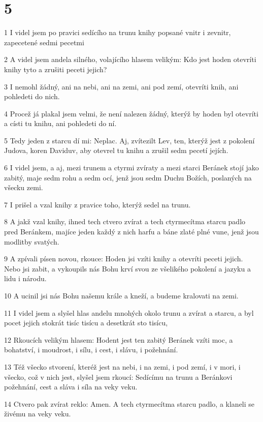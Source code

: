 \chapter{5}

\par 1 I videl jsem po pravici sedícího na trunu knihy popsané vnitr i zevnitr, zapecetené sedmi pecetmi
\par 2 A videl jsem andela silného, volajícího hlasem velikým: Kdo jest hoden otevríti knihy tyto a zrušiti peceti jejich?
\par 3 I nemohl žádný, ani na nebi, ani na zemi, ani pod zemí, otevríti knih, ani pohledeti do nich.
\par 4 Procež já plakal jsem velmi, že není nalezen žádný, kterýž by hoden byl otevríti a císti tu knihu, ani pohledeti do ní.
\par 5 Tedy jeden z starcu dí mi: Neplac. Aj, zvítezilt Lev, ten, kterýž jest z pokolení Judova, koren Daviduv, aby otevrel tu knihu a zrušil sedm pecetí jejích.
\par 6 I videl jsem, a aj, mezi trunem a ctyrmi zvíraty a mezi starci Beránek stojí jako zabitý, maje sedm rohu a sedm ocí, jenž jsou sedm Duchu Božích, poslaných na všecku zemi.
\par 7 I prišel a vzal knihy z pravice toho, kterýž sedel na trunu.
\par 8 A jakž vzal knihy, ihned tech ctvero zvírat a tech ctyrmecítma starcu padlo pred Beránkem, majíce jeden každý z nich harfu a báne zlaté plné vune, jenž jsou modlitby svatých.
\par 9 A zpívali písen novou, rkouce: Hoden jsi vzíti knihy a otevríti peceti jejich. Nebo jsi zabit, a vykoupils nás Bohu krví svou ze všelikého pokolení a jazyku a lidu i národu.
\par 10 A ucinil jsi nás Bohu našemu krále a kneží, a budeme kralovati na zemi.
\par 11 I videl jsem a slyšel hlas andelu mnohých okolo trunu a zvírat a starcu, a byl pocet jejich stokrát tisíc tisícu a desetkrát sto tisícu,
\par 12 Rkoucích velikým hlasem: Hodent jest ten zabitý Beránek vzíti moc, a bohatství, i moudrost, i sílu, i cest, i slávu, i požehnání.
\par 13 Též všecko stvorení, kteréž jest na nebi, i na zemi, i pod zemí, i v mori, i všecko, což v nich jest, slyšel jsem rkoucí: Sedícímu na trunu a Beránkovi požehnání, cest a sláva i síla na veky veku.
\par 14 Ctvero pak zvírat reklo: Amen. A tech ctyrmecítma starcu padlo, a klaneli se živému na veky veku.

